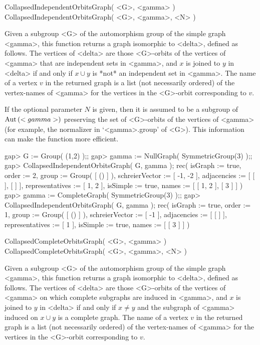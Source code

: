 \>CollapsedIndependentOrbitsGraph( <G>, <gamma> )
\>CollapsedIndependentOrbitsGraph( <G>, <gamma>, <N> )

Given a subgroup <G> of the automorphism group of the simple graph
<gamma>, this function returns a graph isomorphic to <delta>, defined as
follows. The vertices of <delta> are those <G>-orbits of the vertices of
<gamma> that are independent sets in <gamma>, and $x$ is joined to $y$ in
<delta> if and only if $x\cup y$ is *not* an independent set in <gamma>.
The name of a vertex $v$ in the returned graph is a list (not necessarily
ordered) of the vertex-names of <gamma> for the vertices in the <G>-orbit
corresponding to $v$.

If the optional parameter $N$ is given, then it is assumed to be a
subgroup of ${\rm Aut}\,(<gamma>)$ preserving the set of <G>-orbits of the
vertices of <gamma> (for example, the normalizer in `<gamma>.group' of
<G>). This information can make the function more efficient.

\beginexample
gap> G := Group( (1,2) );;
gap> gamma := NullGraph( SymmetricGroup(3) );;
gap> CollapsedIndependentOrbitsGraph( G, gamma );
rec(
  isGraph := true,
  order := 2,
  group := Group( [ () ] ),
  schreierVector := [ -1, -2 ],
  adjacencies := [ [  ], [  ] ],
  representatives := [ 1, 2 ],
  isSimple := true,
  names := [ [ 1, 2 ], [ 3 ] ] )
gap> gamma := CompleteGraph( SymmetricGroup(3) );;
gap> CollapsedIndependentOrbitsGraph( G, gamma );
rec(
  isGraph := true,
  order := 1,
  group := Group( [ () ] ),
  schreierVector := [ -1 ],
  adjacencies := [ [  ] ],
  representatives := [ 1 ],
  isSimple := true,
  names := [ [ 3 ] ] )
\endexample


\>CollapsedCompleteOrbitsGraph( <G>, <gamma> )
\>CollapsedCompleteOrbitsGraph( <G>, <gamma>, <N> )

Given a subgroup <G> of the automorphism group of the simple graph
<gamma>, this function returns a graph isomorphic to <delta>, defined as
follows. The vertices of <delta> are those <G>-orbits of the vertices
of <gamma> on which complete subgraphs are induced in <gamma>, and $x$
is joined to $y$ in <delta> if and only if $x\not=y$ and the subgraph of
<gamma> induced on $x\cup y$ is a complete graph.  The name of a vertex
$v$ in the returned graph is a list (not necessarily ordered) of the
vertex-names of <gamma> for the vertices in the <G>-orbit corresponding
to $v$.

